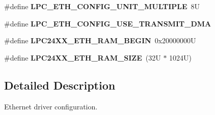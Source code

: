 \begin{DoxyCompactItemize}
\mbox{\label{lpc24xx_2include_2bsp_2lpc-ethernet-config_8h_abeebe4c2131ca732ee4852c5a9891d58}} 
\#define {\bfseries L\+P\+C\+\_\+\+E\+T\+H\+\_\+\+C\+O\+N\+F\+I\+G\+\_\+\+U\+N\+I\+T\+\_\+\+M\+U\+L\+T\+I\+P\+LE}~8U
\item 
\mbox{\label{lpc24xx_2include_2bsp_2lpc-ethernet-config_8h_a83c865183f8f38ee3d081084d3b37cb0}} 
\#define {\bfseries L\+P\+C\+\_\+\+E\+T\+H\+\_\+\+C\+O\+N\+F\+I\+G\+\_\+\+U\+S\+E\+\_\+\+T\+R\+A\+N\+S\+M\+I\+T\+\_\+\+D\+MA}
\item 
\mbox{\label{lpc24xx_2include_2bsp_2lpc-ethernet-config_8h_a822a5b05d9d3c7cd83053dea5323acde}} 
\#define {\bfseries L\+P\+C24\+X\+X\+\_\+\+E\+T\+H\+\_\+\+R\+A\+M\+\_\+\+B\+E\+G\+IN}~0x20000000U
\item 
\mbox{\label{lpc24xx_2include_2bsp_2lpc-ethernet-config_8h_a9f987309d7cd4b4ea00d2b7f698d0722}} 
\#define {\bfseries L\+P\+C24\+X\+X\+\_\+\+E\+T\+H\+\_\+\+R\+A\+M\+\_\+\+S\+I\+ZE}~(32\+U $\ast$ 1024\+U)
\end{DoxyCompactItemize}


\subsection{Detailed Description}
Ethernet driver configuration. 


